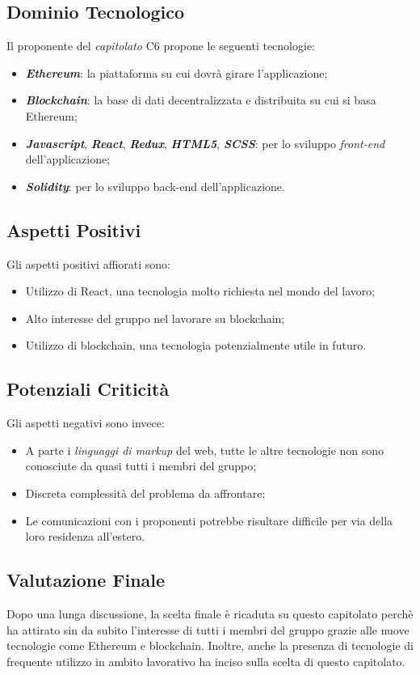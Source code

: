 \subsection{Dominio Tecnologico}
Il proponente del \textit{capitolato} C6 propone le seguenti tecnologie:
\begin{itemize}
	\item \textit{\textbf{Ethereum}}: la piattaforma su cui dovrà girare l'applicazione;
	\item \textit{\textbf{Blockchain}}: la base di dati decentralizzata e distribuita su cui si basa Ethereum;
	\item \textbf{\textit{Javascript}}, \textit{\textbf{React}}, \textit{\textbf{Redux}}, \textbf{\textit{HTML5}}, \textit{\textbf{SCSS}}: 
	per lo sviluppo \textit{front-end} dell'applicazione;
	\item \textit{\textbf{Solidity}}: per lo sviluppo back-end dell'applicazione.
\end{itemize}

\subsection{Aspetti Positivi}
Gli aspetti positivi affiorati sono:
\begin{itemize}
	\item Utilizzo di React, una tecnologia molto richiesta nel mondo del lavoro;
	\item Alto interesse del gruppo nel lavorare su blockchain;
	\item Utilizzo di blockchain, una tecnologia potenzialmente utile in futuro.
\end{itemize}

\subsection{Potenziali Criticità}
Gli aspetti negativi sono invece:
\begin{itemize}
	\item A parte i \textit{linguaggi di markup} del web, tutte le altre tecnologie non sono conosciute da quasi tutti i membri del gruppo;
	\item Discreta complessità del problema da affrontare;
	\item Le comunicazioni con i proponenti potrebbe risultare difficile per via della loro residenza all'estero.
\end{itemize}

\subsection{Valutazione Finale}
Dopo una lunga discussione, la scelta finale è ricaduta su questo capitolato perchè ha attirato sin da subito l'interesse di tutti i membri del gruppo grazie alle nuove tecnologie come Ethereum e blockchain.
Inoltre, anche la presenza di tecnologie di frequente utilizzo in ambito lavorativo ha inciso sulla scelta di questo capitolato.
